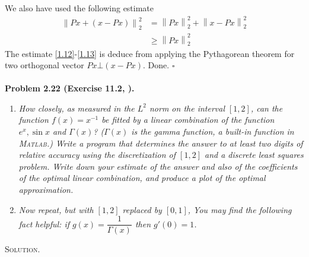 \documentclass[a4paper,oneside]{book}
\numberwithin{equation}{chapter}
\begin{document}
We also have used the following estimate
\begin{align}
\label{1.12}
\left\| {Px + \left( {x - Px} \right)} \right\|_2^2 &= \left\| {Px} \right\|_2^2 + \left\| {x - Px} \right\|_2^2\\
 &\ge \left\| {Px} \right\|_2^2 \label{1.13}
\end{align}
The estimate \eqref{1.12}-\eqref{1.13} is deduce from applying the Pythagorean theorem for two orthogonal vector $Px \bot \left( {x - Px} \right)$. Done. \hfill $\square$\\
\\
\textbf{Problem 2.22 (Exercise 11.2, \cite{1}).}
\begin{enumerate}
\item \textit{How closely, as measured in the $L^2$ norm on the interval $\left[1,2\right]$, can the function $f\left(x\right)=x^{-1}$ be fitted by a linear combination of the function $e^x, \sin x$ and $\Gamma \left(x\right)$? ($\Gamma \left(x\right)$ is the gamma function, a built-in function in \textsc{Matlab}.) Write a program that determines the answer to at least two digits of relative accuracy using the discretization of $\left[1,2\right]$ and a discrete least squares problem. Write down your estimate of the answer and also of the coefficients of the optimal linear combination, and produce a plot of the optimal approximation.}
\item \textit{Now repeat, but with $\left[1,2\right]$ replaced by $\left[0,1\right]$, You may find the following fact helpful: if $g\left( x \right) = \dfrac{1}{{\Gamma \left( x \right)}}$ then $g'\left( 0 \right) = 1$.}
\end{enumerate}
\textsc{Solution.} 
\end{document}
